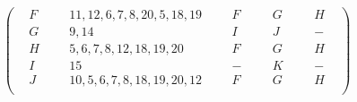 \documentclass[a4paper,12pt]{article} %
\begin{document}
\[\begin{pmatrix}
\hspace{10pt}F\hspace{9pt}&\hspace{10pt}11,12,6,7,8,20,5,18,19\hspace{9pt}&\hspace{10pt}F\hspace{10pt}&\hspace{10pt}G\hspace{10pt}&\hspace{10pt}H\hspace{10pt}\\

\hspace{10pt}G\hspace{9pt}&\hspace{10pt}9,14\hspace{9pt}&\hspace{10pt}I\hspace{10pt}&\hspace{10pt}J\hspace{10pt}&\hspace{10pt}-\hspace{10pt}\\


\hspace{10pt}H\hspace{9pt}&\hspace{10pt}5,6,7,8,12,18,19,20\hspace{9pt}&\hspace{10pt}F\hspace{10pt}&\hspace{10pt}G\hspace{10pt}&\hspace{10pt}H\hspace{10pt}\\


\hspace{10pt}I\hspace{9pt}&\hspace{10pt}15\hspace{9pt}&\hspace{10pt}-\hspace{10pt}&\hspace{10pt}K\hspace{10pt}&\hspace{10pt}-\hspace{10pt}\\

\hspace{10pt}J\hspace{9pt}&\hspace{10pt}10,5,6,7,8,18,19,20,12\hspace{9pt}&\hspace{10pt}F\hspace{10pt}&\hspace{10pt}G\hspace{10pt}&\hspace{10pt}H\hspace{10pt}\\


\end{pmatrix}\]
\end{document}
